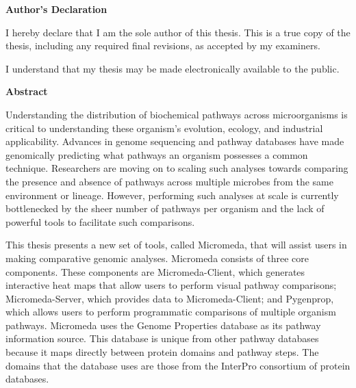 \cleardoublepage %


\begin{center}\textbf{Author's Declaration}\end{center}  
  
  
  \noindent
I hereby declare that I am the sole author of this thesis. This is a true copy of the thesis, including any required final revisions, as accepted by my examiners.

  \bigskip
  
  \noindent
I understand that my thesis may be made electronically available to the public.

\cleardoublepage


\begin{center}\textbf{Abstract}\end{center}

Understanding the distribution of biochemical pathways across microorganisms is 
critical to understanding these organism's evolution, ecology, and industrial 
applicability. Advances in genome sequencing and pathway databases have made 
genomically predicting what pathways an organism possesses a common technique. 
Researchers are moving on to scaling such analyses towards comparing the 
presence and absence of pathways across multiple microbes from the same 
environment or lineage. However, performing such analyses at scale is currently 
bottlenecked by the sheer number of pathways per organism and the lack of 
powerful tools to facilitate such comparisons. 

This thesis presents a new set of tools, called Micromeda, that will assist 
users in making comparative genomic analyses. Micromeda consists of three core 
components. These components are Micromeda-Client, which generates interactive 
heat maps that allow users to perform visual pathway comparisons; 
Micromeda-Server, which provides data to Micromeda-Client; and Pygenprop, which 
allows users to perform programmatic comparisons of multiple organism pathways. 
Micromeda uses the Genome Properties database as its pathway information source. 
This database is unique from other pathway databases because it maps directly 
between protein domains and pathway steps. The domains that the database uses 
are those from the InterPro consortium of protein databases. 

